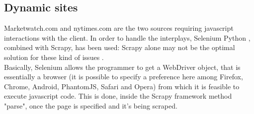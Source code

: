 \subsection{Dynamic sites}
Marketwatch.com and nytimes.com are the two sources requiring javascript interactions with the client. In order to handle the interplays, Selenium Python \cite{selenium}, combined with Scrapy, has been used: Scrapy alone may not be the optimal solution for these kind of issues \cite{scrapyvsselenium}. \\
Basically, Selenium allows the programmer to get a WebDriver object, that is essentially a browser (it is possible to specify a preference here among Firefox, Chrome, Android, PhantomJS, Safari and Opera) from which it is feasible to execute javascript code. This is done, inside the Scrapy framework method "parse", once the page is specified and it's being scraped. \\
